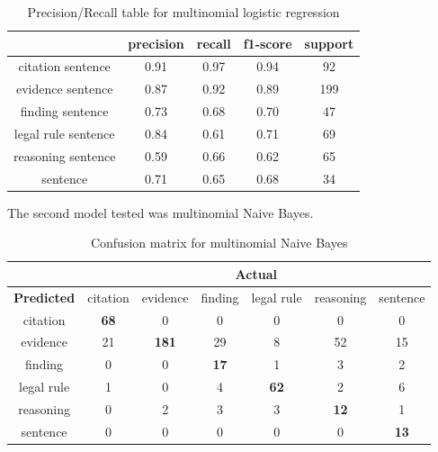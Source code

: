 \documentclass[11pt]{article}
\begin{document}
\vspace{1.4em}
\begin{table}
  \centering
  \begin{tabular}{| c | c | c | c | c |}
    \hline
    &                   precision  &   recall &  f1-score  &  support \\
    \hline
    citation sentence &       0.91 &     0.97 &     0.94 &       92 \\
    evidence sentence &       0.87 &     0.92 &     0.89 &      199 \\
    finding sentence &       0.73 &     0.68 &     0.70 &       47 \\
    legal rule sentence &       0.84 &     0.61 &     0.71 &       69 \\
    reasoning sentence &       0.59 &     0.66 &     0.62 &       65 \\
    sentence &       0.71 &     0.65 &     0.68 &       34 \\
    \hline
  \end{tabular}
  \caption{Precision/Recall table for multinomial logistic regression}
  \label{table:prLR}
\end{table}
\vspace{0.3em}

The second model tested was multinomial Naive Bayes.

\vspace{1.4em}
\begin{table}[h]
  \centering
  \begin{tabular}{| c| c| c| c| c| c| c|}
    \hline
    & \multicolumn{6}{|c|}{\textbf{Actual}} \\
    \hline
    \textbf{Predicted} & citation & evidence & finding & legal rule & reasoning & sentence \\
    \hline
    citation  & \textbf{68} &    0    &  0     &    0      &        0  &    0 \\ 
    evidence  &  21   & \textbf{181} &       29   &     8     &       52  &    15  \\
    finding   &    0   &    0    & \textbf{17}  &    1      &        3  &    2  \\
    legal rule &    1   &    0    &        4    & \textbf{62} &    2     &    6  \\
    reasoning &    0   &    2   &        3    &    3    &  \textbf{12} &   1  \\
    sentence  &    0   &   0    &        0     &    0   &         0     & \textbf{13}\\
    \hline
  \end{tabular}
  \caption{Confusion matrix for multinomial Naive Bayes}
  \label{table:LR}
\end{table}
\vspace{0.3em}
\end{document}
